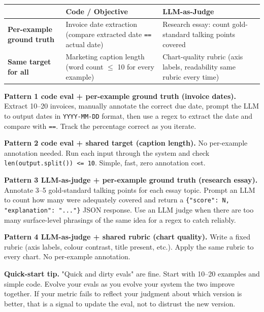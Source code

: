 \documentclass[a4paper,11pt]{article}
\begin{document}
\begin{center}\small
\begin{tabular}{p{3.8cm} p{4.5cm} p{4.5cm}}
  \toprule
   & \textbf{Code / Objective} & \textbf{LLM-as-Judge} \\
  \midrule
  \textbf{Per-example ground truth} &
    Invoice date extraction \newline (compare extracted date \texttt{==} actual date) &
    Research essay: count gold-standard talking points covered \\
  \addlinespace
  \textbf{Same target for all} &
    Marketing caption length \newline (word count $\leq$ 10 for every example) &
    Chart-quality rubric \newline (axis labels, readability \textemdash{} same rubric every time) \\
  \bottomrule
\end{tabular}
\end{center}

\textbf{Pattern 1 \textemdash{} code eval + per-example ground truth
(invoice dates).} Extract 10–20 invoices, manually annotate the
correct due date, prompt the LLM to output dates in
\texttt{YYYY-MM-DD} format, then use a regex to extract the date and
compare with \texttt{==}. Track the percentage correct as you
iterate.

\textbf{Pattern 2 \textemdash{} code eval + shared target (caption
length).} No per-example annotation needed. Run each input through
the system and check \texttt{len(output.split()) <= 10}. Simple,
fast, zero annotation cost.

\textbf{Pattern 3 \textemdash{} LLM-as-judge + per-example ground
truth (research essay).} Annotate 3–5 gold-standard talking points
for each essay topic. Prompt an LLM to count how many were adequately
covered and return a \texttt{\{"score": N, "explanation": "..."\}}
JSON response. Use an LLM judge when there are too many surface-level
phrasings of the same idea for a regex to catch reliably.

\textbf{Pattern 4 \textemdash{} LLM-as-judge + shared rubric (chart
quality).} Write a fixed rubric (axis labels, colour contrast, title
present, etc.). Apply the same rubric to every chart. No per-example
annotation.

\begin{ambercallout}
\textbf{Quick-start tip.}
"Quick and dirty evals" are fine. Start with 10–20 examples and
simple code. Evolve your evals as you evolve your system
\textemdash{} the two improve together. If your metric fails to
reflect your judgment about which version is better, that is a
signal to update the eval, not to distrust the new version.
\end{ambercallout}
\end{document}
